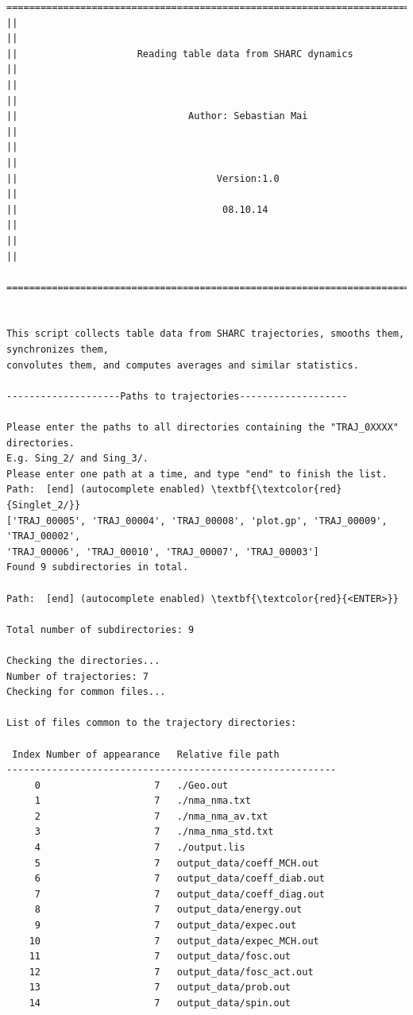 \documentclass[a4paper,11pt,DIV=15,openany]{scrbook}
\begin{document}
\begin{oframed}
\footnotesize\begin{Verbatim}[commandchars=\\\{\}]
  ================================================================================
||                                                                                ||
||                     Reading table data from SHARC dynamics                     ||
||                                                                                ||
||                              Author: Sebastian Mai                             ||
||                                                                                ||
||                                   Version:1.0                                  ||
||                                    08.10.14                                    ||
||                                                                                ||
  ================================================================================


This script collects table data from SHARC trajectories, smooths them, synchronizes them,
convolutes them, and computes averages and similar statistics.
  
--------------------Paths to trajectories-------------------

Please enter the paths to all directories containing the "TRAJ_0XXXX" directories.
E.g. Sing_2/ and Sing_3/. 
Please enter one path at a time, and type "end" to finish the list.
Path:  [end] (autocomplete enabled) \textbf{\textcolor{red}{Singlet_2/}}
['TRAJ_00005', 'TRAJ_00004', 'TRAJ_00008', 'plot.gp', 'TRAJ_00009', 'TRAJ_00002', 
'TRAJ_00006', 'TRAJ_00010', 'TRAJ_00007', 'TRAJ_00003']
Found 9 subdirectories in total.

Path:  [end] (autocomplete enabled) \textbf{\textcolor{red}{<ENTER>}}

Total number of subdirectories: 9

Checking the directories...
Number of trajectories: 7
Checking for common files...

List of files common to the trajectory directories:

 Index Number of appearance   Relative file path
----------------------------------------------------------
     0                    7   ./Geo.out
     1                    7   ./nma_nma.txt
     2                    7   ./nma_nma_av.txt
     3                    7   ./nma_nma_std.txt
     4                    7   ./output.lis
     5                    7   output_data/coeff_MCH.out
     6                    7   output_data/coeff_diab.out
     7                    7   output_data/coeff_diag.out
     8                    7   output_data/energy.out
     9                    7   output_data/expec.out
    10                    7   output_data/expec_MCH.out
    11                    7   output_data/fosc.out
    12                    7   output_data/fosc_act.out
    13                    7   output_data/prob.out
    14                    7   output_data/spin.out


\end{Verbatim}
\end{oframed}
\end{document}
